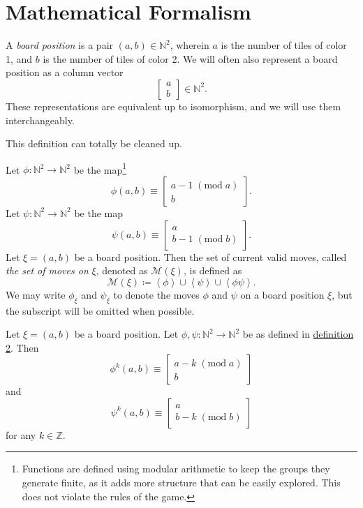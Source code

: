 \documentclass[11pt, letterpaper]{article}
\renewcommand{\mod}[1]{\;(\text{mod}\;#1)}
\begin{document}
\section{Mathematical Formalism}\label{sec:2}
\begin{definition}\label{dfn:1}
	A \emph{board position} is a pair $(a,b)\in\mathbb{N}^2$, wherein $a$ is the number of tiles of color 1, and $b$ is the number of tiles of color 2. We will often also represent a board position as a column vector
	\[
		\begin{bmatrix}a\\ b\end{bmatrix}\in\mathbb{N}^2
	.\]
	These representations are equivalent up to isomorphism, and we will use them interchangeably.
\end{definition}
\begin{definition}[Moves]\label{dfn:2}
	This definition can totally be cleaned up.

	Let $\phi : \mathbb{N}^2 \to \mathbb{N}^2$ be the map\footnote{Functions are defined using modular arithmetic to keep the groups they generate finite, as it adds more structure that can be easily explored. This does not violate the rules of the game.}
	\[
		\phi (a,b)\equiv \begin{bmatrix}a-1\mod{a}\\b\end{bmatrix}
	.\]
	Let $\psi : \mathbb{N}^2 \to \mathbb{N}^2$ be the map
	\[
		\psi (a,b)\equiv \begin{bmatrix} a \\ b-1\mod{b} \end{bmatrix} 
	.\]
	Let $\xi =(a,b)$ be a board position. Then the set of current valid moves, called \emph{the set of moves on} $\xi $, denoted as $\mathscr{M} (\xi )$, is defined as
	\[
		\mathscr{M} (\xi )\coloneqq \left< \phi  \right>\cup \left<\psi  \right>\cup \left<\phi \psi   \right>
	.\]
	We may write $\phi _\xi $ and $\psi _\xi $ to denote the moves $\phi $ and $\psi $ on a board position $\xi $, but the subscript will be omitted when possible.
\end{definition}
\begin{proposition}\label{prp:1}
	Let $\xi =(a,b)$ be a board position. Let $\phi ,\psi :\mathbb{N}^2\to \mathbb{N}^2$ be as defined in \hyperref[dfn:2]{definition 2}. Then
	\[
		\phi ^k(a,b)\equiv \begin{bmatrix} a-k\mod{a} \\ b \end{bmatrix} 
	\]
	and
	\[
		\psi ^k(a,b)\equiv \begin{bmatrix} a \\ b-k\mod{b} \end{bmatrix} 
	\]
	for any $k\in\mathbb{Z}$.
\end{proposition}
\end{document}
